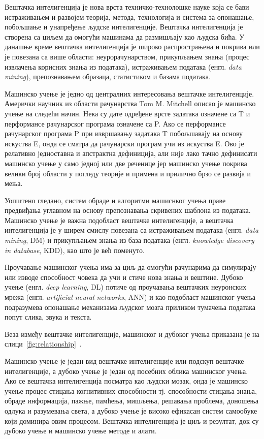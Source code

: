 \documentclass[master]{finthesis}
\begin{document}
Вештачка интелигенција је нова врста техничко-технолошке науке која се бави истраживањем и развојем теорија, метода, технологија и система за опонашање, побољшање и унапређење људске интелигенције. Вештачка интелигенција је створена са циљем да омогући машинама да размишљају као људска бића. У данашње време вештачка интелигенција је широко распрострањена и покрива или је повезана са више области: неурорачунарством, прикупљањем знања (процес извлачења корисних знања из података), истраживањем података (енгл. \textit{data mining}), препознавањем образаца, статистиком и базама података. 

Машинско учење је једно од централних интересовања вештачке интелигенције. Амерички научник из области рачунарства Tom M. Mitchell описао је машинско учење на следећи начин. Нека су дате одређене врсте задатака означене са T и перформансе рачунарског програма означене са P. Ако се перформансе рачунарског програма P при извршавању задатака T побољшавају на основу искуства E, онда се сматра да рачунарски програм учи из искуства E. Ово је релативно једноставна и апстрактна дефиниција, али није лако тачно дефинисати машинско учење у само једној или две реченице јер машинско учење покрива велики број области у погледу теорије и примена и прилично брзо се развија и мења. 

Уопштено гледано, систем обраде и алгоритми машиснког учења праве предвиђања углавном на основу препознавања скривених шаблона из података. Машинско учење је важна подобласт вештачке интелигенције, а вештачка интелигенција је у ширем смислу повезана са истраживањем података (енгл. \textit{data mining}, DM) и прикупљањем знања из база података (енгл. \textit{knowledge discovery in database}, KDD), као што је већ поменуто.

Проучавање машинског учења има за циљ да омогући рачунарима да симулираjу
или изводе способност човека да учи и стиче нова знања и вештине. Дубоко учење (енгл. \textit{deep learning}, DL) потиче од проучавања вештачких неуронских мрежа (енгл. \textit{artificial neural networks}, ANN) и као подобласт машинског учења подразумева опонашање механизама људског мозга приликом тумачења података
попут слика, звука и текста.

Веза између вештачке интелигенције, машинског и дубоког учења приказана је на слици~\ref{fig:relationship}~\cite{Huawei2023AI}.

Машинско учење је један вид вештачке интелигенције или подскуп вештачке интелигенције, а дубоко учење је један од посебних облика машинског учења. Ако се вештачка интелигенција посматра као људски мозак, онда је машинско учење процес стицања когнитивних способности тј. способности стицања знања, обраде информација, пажње, памћења, мишљења, решавања проблема, доношења одлука и разумевања света, а дубоко учење је високо ефикасан систем самообуке који доминира овим процесом. Вештачка интелигенција је циљ и резултат, док су дубоко учење и машинско учење методе и алати.
\end{document}
